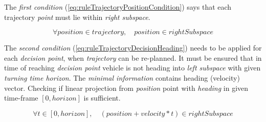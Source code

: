 The \emph{first condition} (\ref{eq:ruleTrajectoryPositionCondition}) says that each trajectory \emph{point} must lie within \emph{right subspace}. 

\begin{equation}\label{eq:ruleTrajectoryPositionCondition}
    \forall position \in trajectory,\quad position \in rightSubspace
\end{equation}

\noindent The \emph{second condition} (\ref{eq:ruleTrajectoryDecisionHeading}) needs to be applied for each \emph{decision point}, when \emph{trajectory} can be re-planned. It must be ensured that in time of reaching \emph{decision point} vehicle is not heading into \emph{left subspace} with given \emph{turning time horizon}. The \emph{minimal information} contains heading (velocity) vector. Checking if linear projection from \emph{position} point with \emph{heading} in given time-frame $[0,horizon]$ is sufficient.

\begin{equation}\label{eq:ruleTrajectoryDecisionHeading}
    \forall t\in[0,horizon],\quad \left(position + velocity*t\right) \in rightSubspace
\end{equation}


